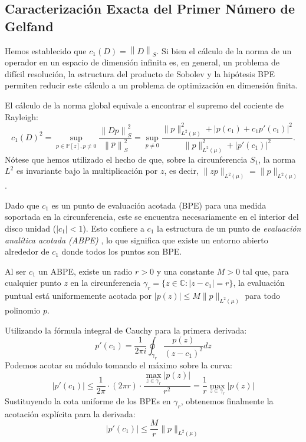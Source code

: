\documentclass[12pt,a4paper]{article}
\theoremstyle{definition}
\theoremstyle{remark}
\newcommand{\Poly}{\mathbb{P}[z]}
\newcommand{\norm}[1]{\left\| #1 \right\|_S}
\newcommand{\abs}[1]{\left| #1 \right|}
\begin{document}
\subsection{Caracterización Exacta del Primer Número de Gelfand}

Hemos establecido que $c_1(D) = \norm{D}$. Si bien el cálculo de la norma de un operador en un espacio de dimensión infinita es, en general, un problema de difícil resolución, la estructura del producto de Sobolev y la hipótesis BPE permiten reducir este cálculo a un problema de optimización en dimensión finita.

El cálculo de la norma global equivale a encontrar el supremo del cociente de Rayleigh:
\begin{equation} \label{eq:rayleigh_c1}
    c_1(D)^2 = \sup_{p \in \Poly, p \neq 0} \frac{\norm{Dp}^2}{\norm{p}^2} = \sup_{p \neq 0} \frac{\|p\|_{L^2(\mu)}^2 + \abs{p(c_1) + c_1 p'(c_1)}^2}{\|p\|_{L^2(\mu)}^2 + \abs{p'(c_1)}^2}.
\end{equation}
Nótese que hemos utilizado el hecho de que, sobre la circunferencia $S_1$, la norma $L^2$ es invariante bajo la multiplicación por $z$, es decir, $\|zp\|_{L^2(\mu)} = \|p\|_{L^2(\mu)}$.

Dado que $c_1$ es un punto de evaluación acotada (BPE) para una medida soportada en la circunferencia, este se encuentra necesariamente en el interior del disco unidad ($|c_1| < 1$). Esto confiere a $c_1$ la estructura de un punto de \textit{evaluación analítica acotada (ABPE)} \cite{conway2020approximationmeanrationalfunctions, aleman2009nontangential}, lo que significa que existe un entorno abierto alrededor de $c_1$ donde todos los puntos son BPE.

Al ser $c_1$ un ABPE, existe un radio $r > 0$ y una constante $M > 0$ tal que, para cualquier punto $z$ en la circunferencia $\gamma_r = \{z \in \mathbb{C} : |z - c_1| = r\}$, la evaluación puntual está uniformemente acotada por $|p(z)| \le M \|p\|_{L^2(\mu)}$ para todo polinomio $p$.

Utilizando la fórmula integral de Cauchy para la primera derivada:
\begin{equation}
    p'(c_1) = \frac{1}{2\pi i} \oint_{\gamma_r} \frac{p(z)}{(z-c_1)^2} dz
\end{equation}
Podemos acotar su módulo tomando el máximo sobre la curva:
\begin{equation}
    |p'(c_1)| \le \frac{1}{2\pi} \cdot (2\pi r) \cdot \frac{\max_{z \in \gamma_r} |p(z)|}{r^2} = \frac{1}{r} \max_{z \in \gamma_r} |p(z)|
\end{equation}
Sustituyendo la cota uniforme de los BPEs en $\gamma_r$, obtenemos finalmente la acotación explícita para la derivada:
\begin{equation}
    |p'(c_1)| \le \frac{M}{r} \|p\|_{L^2(\mu)}
\end{equation}
\end{document}
